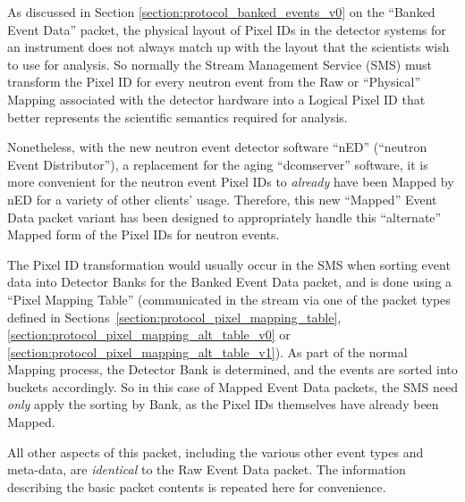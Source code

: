 As discussed in Section \ref{section:protocol_banked_events_v0}
on the ``Banked Event Data'' packet,
the physical layout of Pixel IDs in the detector systems for an instrument
does not always match up with the layout that the scientists wish to use
for analysis.
So normally the Stream Management Service (SMS) must transform the Pixel ID
for every neutron event
from the Raw or ``Physical'' Mapping associated with the detector hardware
into a Logical Pixel ID that better represents the scientific semantics
required for analysis.

Nonetheless, with the new neutron event detector software ``nED''
(``neutron Event Distributor''),
a replacement for the aging ``dcomserver'' software,
it is more convenient for the neutron event Pixel IDs
to {\it already} have been Mapped by nED for a variety
of other clients' usage.
Therefore, this new ``Mapped'' Event Data packet variant has been
designed to appropriately handle this ``alternate'' Mapped form
of the Pixel IDs for neutron events.

The Pixel ID transformation would usually occur in the SMS
when sorting event data into Detector Banks
for the Banked Event Data packet,
and is done using a ``Pixel Mapping Table''
(communicated in the stream via one of the packet types defined
in Sections~\ref{section:protocol_pixel_mapping_table},
\ref{section:protocol_pixel_mapping_alt_table_v0}
or \ref{section:protocol_pixel_mapping_alt_table_v1}).
As part of the normal Mapping process, the Detector Bank is determined,
and the events are sorted into buckets accordingly.
So in this case of Mapped Event Data packets,
the SMS need {\it only} apply the sorting by Bank,
as the Pixel IDs themselves have already been Mapped.

All other aspects of this packet, including the various other event types
and meta-data, are {\it identical} to the Raw Event Data packet.
The information describing the basic packet contents
is repeated here for convenience.

